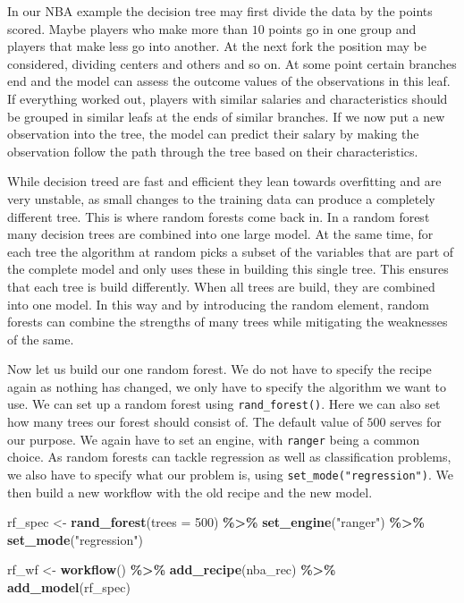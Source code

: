 \documentclass[
]{book}
\newenvironment{Shaded}{\begin{snugshade}}{\end{snugshade}}
\newcommand{\AttributeTok}[1]{\textcolor[rgb]{0.13,0.29,0.53}{#1}}
\newcommand{\DecValTok}[1]{\textcolor[rgb]{0.00,0.00,0.81}{#1}}
\newcommand{\FunctionTok}[1]{\textcolor[rgb]{0.13,0.29,0.53}{\textbf{#1}}}
\newcommand{\NormalTok}[1]{#1}
\newcommand{\OtherTok}[1]{\textcolor[rgb]{0.56,0.35,0.01}{#1}}
\newcommand{\SpecialCharTok}[1]{\textcolor[rgb]{0.81,0.36,0.00}{\textbf{#1}}}
\newcommand{\StringTok}[1]{\textcolor[rgb]{0.31,0.60,0.02}{#1}}
\begin{document}
In our NBA example the decision tree may first divide the data by the
points scored. Maybe players who make more than \(10\) points go in one group and
players that make less go into another. At the next fork the position may be
considered, dividing centers and others and so on. At some point certain
branches end and the model can assess the outcome values of the observations in
this leaf. If everything worked out, players with similar salaries and
characteristics should be grouped in similar leafs at the ends of similar
branches. If we now put a new observation into the tree, the model can predict
their salary by making the observation follow the path through the tree based on
their characteristics.

While decision treed are fast and efficient they lean towards overfitting and
are very unstable, as small changes to the training data can produce a
completely different tree. This is where random forests come back in. In a
random forest many decision trees are combined into one large model. At the same
time, for each tree the algorithm at random picks a subset of the variables that
are part of the complete model and only uses these in building this single tree.
This ensures that each tree is build differently. When all trees are build, they
are combined into one model. In this way and by introducing the random element,
random forests can combine the strengths of many trees while mitigating the
weaknesses of the same.

Now let us build our one random forest. We do not have to specify the recipe
again as nothing has changed, we only have to specify the algorithm we want to
use. We can set up a random forest using \texttt{rand\_forest()}. Here we can also
set how many trees our forest should consist of. The default value of \(500\)
serves for our purpose. We again have to set an engine,
with \texttt{ranger} being a common choice. As random forests can tackle regression as
well as classification problems, we also have to specify what our problem is,
using \texttt{set\_mode("regression")}. We then build a new workflow with the old recipe
and the new model.

\begin{Shaded}
\begin{Highlighting}[]
\NormalTok{rf\_spec }\OtherTok{\textless{}{-}} \FunctionTok{rand\_forest}\NormalTok{(}\AttributeTok{trees =} \DecValTok{500}\NormalTok{) }\SpecialCharTok{\%\textgreater{}\%} 
  \FunctionTok{set\_engine}\NormalTok{(}\StringTok{"ranger"}\NormalTok{) }\SpecialCharTok{\%\textgreater{}\%} 
  \FunctionTok{set\_mode}\NormalTok{(}\StringTok{"regression"}\NormalTok{)}

\NormalTok{rf\_wf }\OtherTok{\textless{}{-}} \FunctionTok{workflow}\NormalTok{() }\SpecialCharTok{\%\textgreater{}\%} 
  \FunctionTok{add\_recipe}\NormalTok{(nba\_rec) }\SpecialCharTok{\%\textgreater{}\%} 
  \FunctionTok{add\_model}\NormalTok{(rf\_spec)}
\end{Highlighting}
\end{Shaded}
\end{document}
